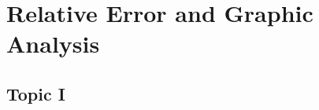 \section{Relative Error and Graphic Analysis}
\label{sec:erroranalysis}

\subsection{Topic I}
\label{subsec:first_topic_error}

%        









